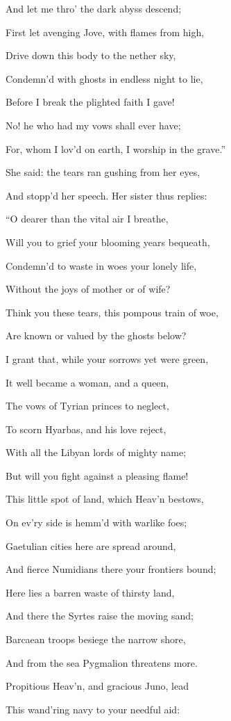 And let me thro’ the dark abyss descend;

First let avenging Jove, with flames from high,

Drive down this body to the nether sky,

Condemn’d with ghosts in endless night to lie,

Before I break the plighted faith I gave!

No! he who had my vows shall ever have;

For, whom I lov’d on earth, I worship in the grave.”

She said: the tears ran gushing from her eyes,

And stopp’d her speech. Her sister thus replies:

“O dearer than the vital air I breathe,

Will you to grief your blooming years bequeath,

Condemn’d to waste in woes your lonely life,

Without the joys of mother or of wife?

Think you these tears, this pompous train of woe,

Are known or valued by the ghosts below?

I grant that, while your sorrows yet were green,

It well became a woman, and a queen,

The vows of Tyrian princes to neglect,

To scorn Hyarbas, and his love reject,

With all the Libyan lords of mighty name;

But will you fight against a pleasing flame!

This little spot of land, which Heav’n bestows,

On ev’ry side is hemm’d with warlike foes;

Gaetulian cities here are spread around,

And fierce Numidians there your frontiers bound;

Here lies a barren waste of thirsty land,

And there the Syrtes raise the moving sand;

Barcaean troops besiege the narrow shore,

And from the sea Pygmalion threatens more.

Propitious Heav’n, and gracious Juno, lead

This wand’ring navy to your needful aid:

